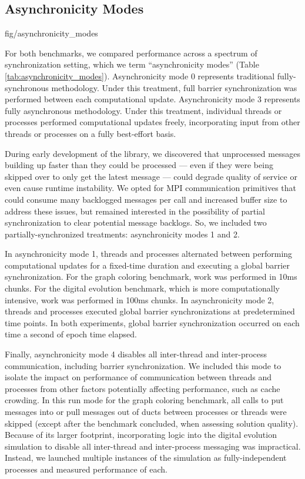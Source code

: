 \subsection{Asynchronicity Modes} \label{sec:asynchronicity_modes}

{fig/asynchronicity_modes}

For both benchmarks, we compared performance across a spectrum of synchronization setting, which we term ``asynchronicity modes'' (Table \ref{tab:asynchronicity_modes}).
Asynchronicity mode 0 represents traditional fully-synchronous methodology.
Under this treatment, full barrier synchronization was performed between each computational update.
Asynchronicity mode 3 represents fully asynchronous methodology.
Under this treatment, individual threads or processes performed computational updates freely, incorporating input from other threads or processes on a fully best-effort basis.

During early development of the library, we discovered that unprocessed messages building up faster than they could be processed --- even if they were being skipped over to only get the latest message --- could degrade quality of service or even cause runtime instability.
We opted for MPI communication primitives that could consume many backlogged messages per call and increased buffer size to address these issues, but remained interested in the possibility of partial synchronization to clear potential message backlogs.
So, we included two partially-synchronized treatments: asynchronicity modes 1 and 2.

In asynchronicity mode 1, threads and processes alternated between performing computational updates for a fixed-time duration and executing a global barrier synchronization.
For the graph coloring benchmark, work was performed in 10ms chunks.
For the digital evolution benchmark, which is more computationally intensive, work was performed in 100ms chunks.
In asynchronicity mode 2, threads and processes executed global barrier synchronizations at predetermined time points.
In both experiments, global barrier synchronization occurred on each time a second of epoch time elapsed.

Finally, asynchronicity mode 4 disables all inter-thread and inter-process communication, including barrier synchronization.
We included this mode to isolate the impact on performance of communication between threads and processes from other factors potentially affecting performance, such as cache crowding.
In this run mode for the graph coloring benchmark, all calls to put messages into or pull messages out of ducts between processes or threads were skipped (except after the benchmark concluded, when assessing solution quality).
Because of its larger footprint, incorporating logic into the digital evolution simulation to disable all inter-thread and inter-process messaging was impractical.
Instead, we launched multiple instances of the simulation as fully-independent processes and measured performance of each.
